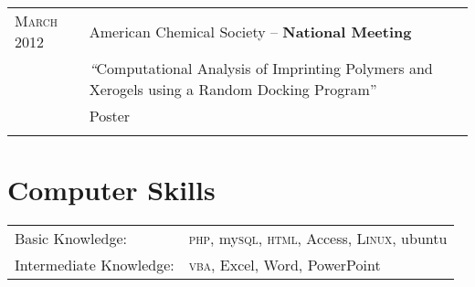 \documentclass[letterpaper,10pt]{article} %
\begin{document}
\begin{tabular}{R{3cm}|p{13cm}}

\textsc{March} 2012 & American Chemical Society -- \textbf{National Meeting} \\
& \emph “Computational Analysis of Imprinting Polymers and Xerogels using a Random Docking Program” \\
& \small Poster \\
 \\


\end{tabular}



\section{Computer Skills}
\noindent 
\begin{tabular}{R{3cm}|p{13cm}} 

Basic Knowledge: & \textsc{php}, my\textsc{sql}, \textsc{html}, Access, \textsc{Linux}, ubuntu\\

Intermediate Knowledge: & \textsc{vba}, Excel, Word, PowerPoint\\

\end{tabular}
\end{document}
